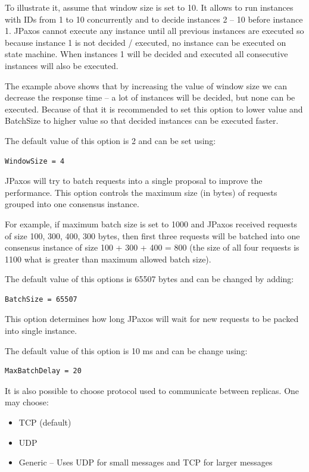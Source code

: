 To illustrate it, assume that window size is set to 10. It allows to run
instances with IDs from 1 to 10 concurrently and to decide instances 2 -- 10
before instance 1. JPaxos cannot execute any instance until all previous
instances are executed so because instance 1 is not decided / executed, no
instance can be executed on state machine. When instances 1 will be
decided and executed all consecutive instances will also be executed.

The example above shows that by increasing the value of window size we can
decrease the response time -- a lot of instances will be decided, but none can
be executed. Because of that it is recommended to set this option to lower
value and BatchSize to higher value so that decided instances can be executed
faster.

The default value of this option is 2 and can be set using:
\begin{Verbatim}
WindowSize = 4
\end{Verbatim}

\label{config:batch-size}
JPaxos will try to batch requests into a single proposal to improve the
performance. This option controls the maximum size (in bytes) of requests
grouped into one consensus instance.

For example, if maximum batch size is set to 1000 and JPaxos received requests
of size 100, 300, 400, 300 bytes, then first three requests will be batched
into one consensus instance of size 100 + 300 + 400 = 800 (the size of all four
requests is 1100 what is greater than maximum allowed batch size).

The default value of this options is 65507 bytes and can be changed by adding:
\begin{Verbatim}
BatchSize = 65507
\end{Verbatim}


\label{config:maximum-batch-delay}
This option determines how long JPaxos will wait for new requests to be packed
into single instance.

The default value of this option is 10 ms and can be change using:
\begin{Verbatim}
MaxBatchDelay = 20
\end{Verbatim}


\label{config:network-protocol}
It is also possible to choose protocol used to communicate between replicas.
One may choose:
\begin{itemize}
\item {} 
TCP (default)

\item {} 
UDP

\item {} 
Generic -- Uses UDP for small messages and TCP for larger messages

\end{itemize}

